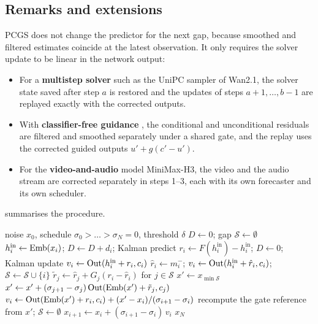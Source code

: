 \subsection{Remarks and extensions}
PCGS does not change the predictor for the next gap, because smoothed and filtered estimates coincide at the latest observation. It only requires the solver update to be linear in the network output:
\begin{itemize}
  \item For a \textbf{multistep solver} such as the UniPC sampler of Wan2.1, the solver state saved after step $a$ is restored and the updates of steps $a{+}1,\dots,b{-}1$ are replayed exactly with the corrected outputs.
  \item With \textbf{classifier-free guidance} \citep{ho2022cfg}, the conditional and unconditional residuals are filtered and smoothed separately under a shared gate, and the replay uses the corrected guided outputs $u'+g(c'-u')$.
  \item For the \textbf{video-and-audio} model MiniMax-H3, the video and the audio stream are corrected separately in steps 1--3, each with its own forecaster and its own scheduler.
\end{itemize}
 summarises the procedure.

\begin{algorithm}[t]
\caption{KalSea sampling. The second \textbf{if} block is PCGS; without it, the procedure is KalSea w/o PCGS.}\label{alg:kalsea}
\begin{algorithmic}[1]
\Require noise $x_0$, schedule $\sigma_0>\dots>\sigma_N=0$, threshold $\delta$
\State $D\gets 0$; gap $\mathcal S\gets\emptyset$
  \State $h^{\mathrm{in}}_i\gets\mathrm{Emb}(x_i)$; $D\gets D+d_i$; Kalman predict 
   
    \State $r_i\gets F(h^{\mathrm{in}}_i)-h^{\mathrm{in}}_i$; $D\gets0$; Kalman update 
    \State $v_i\gets\mathrm{Out}(h^{\mathrm{in}}_i+r_i, c_i)$
  \Else {}
    \State $\hat r_i\gets m^-_i$; $v_i\gets\mathrm{Out}(h^{\mathrm{in}}_i+\hat r_i,c_i)$; $\mathcal S\gets\mathcal S\cup\{i\}$
  \EndIf
    \State $\tilde r_j\gets\hat r_j + G_j(r_i-\hat r_i)$ for $j\in\mathcal S$ 
    \State $x'\gets x_{\min\mathcal S}$
      \State $x'\gets x'+(\sigma_{j+1}-\sigma_j)\,\mathrm{Out}(\mathrm{Emb}(x')+\tilde r_j, c_j)$ 
    \EndFor
    \State $v_i\gets\mathrm{Out}(\mathrm{Emb}(x')+r_i,c_i) + (x'-x_i)/(\sigma_{i+1}-\sigma_i)$ 
    \State recompute the gate reference from $x'$; $\mathcal S\gets\emptyset$
  \EndIf
  \State $x_{i+1}\gets x_i + (\sigma_{i+1}-\sigma_i)\,v_i$ 
\EndFor
\State \Return $x_N$
\end{algorithmic}
\end{algorithm}

